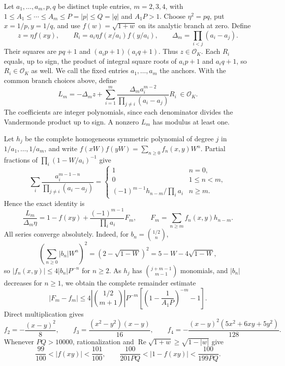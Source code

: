\documentclass[12pt]{article}
\numberwithin{equation}{section}
\begin{document}
Let \(a_1,\ldots,a_m,p,q\) be distinct tuple entries, \(m=2,3,4\), with
\(1\le A_1\le\cdots\le A_m\le P=|p|\le Q=|q|\) and \(A_1P>1\).
Choose \(\eta^2=pq\), put \(x=1/p,y=1/q\), and use
\(f(w)=\sqrt{1+w}\) on its analytic branch at zero. Define
\[
 z=\eta f(xy),\qquad
 R_i=a_i\eta f(x/a_i)f(y/a_i),\qquad
 \Delta_m=\prod_{i<j}(a_i-a_j).
\]
Their squares are \(pq+1\) and \((a_ip+1)(a_iq+1)\).
Thus \(z\in\mathcal O_K\). Each \(R_i\) equals, up to sign, the
product of integral square roots of \(a_ip+1\) and \(a_iq+1\), so
\(R_i\in\mathcal O_K\) as well. We call the fixed entries $a_1,\ldots,a_m$ the anchors.
With the common branch choices above, define
\begin{equation*}
 L_m=-\Delta_m z+
 \sum_{i=1}^m
 \frac{\Delta_m a_i^{m-2}}{\prod_{j\ne i}(a_i-a_j)}R_i
 \ \in\mathcal O_K.
\end{equation*}
The coefficients are integer polynomials, since each denominator divides
the Vandermonde product up to sign. A nonzero \(L_m\) has modulus at least one.

Let \(h_j\) be the complete homogeneous symmetric polynomial of degree
\(j\) in \(1/a_1,\ldots,1/a_m\), and write
\(f(xW)f(yW)=\sum_{n\ge0}f_n(x,y)W^n\).
Partial fractions of \(\prod_i(1-W/a_i)^{-1}\) give
\[
 \sum_i\frac{a_i^{m-1-n}}{\prod_{j\ne i}(a_i-a_j)}
 =\begin{cases}
 1&n=0,\\
 0&1\le n<m,\\
 (-1)^{m-1}h_{n-m}/\prod_i a_i&n\ge m.
 \end{cases}
\]
Hence the exact identity is
\begin{equation}\label{eq:coherent-exact}
 \frac{L_m}{\Delta_m\eta}
 =1-f(xy)+\frac{(-1)^{m-1}}{\prod_i a_i}F_m,\qquad
 F_m=\sum_{n\ge m}f_n(x,y)h_{n-m}.
\end{equation}
All series converge absolutely. Indeed, for \(b_n=\binom{1/2}{n}\),
\[
 \left(\sum_{n\ge0}|b_n|W^n\right)^2
 =(2-\sqrt{1-W})^2=5-W-4\sqrt{1-W},
\]
so \(|f_n(x,y)|\le4|b_n|P^{-n}\) for \(n\ge2\).
As \(h_j\) has \(\binom{j+m-1}{m-1}\) monomials, and \(|b_n|\)
decreases for \(n\ge1\), we obtain the complete remainder estimate
\begin{equation}\label{eq:coherent-tail}
 |F_m-f_m|\le
 4\left|\binom{1/2}{m+1}\right|P^{-m}
 \left[\left(1-\frac1{A_1P}\right)^{-m}-1\right].
\end{equation}
Direct multiplication gives
\begin{equation}\label{eq:integrated-5}
f_2=-\frac{(x-y)^2}{8},\qquad
 f_3=\frac{(x^2-y^2)(x-y)}{16},\qquad
 f_4=-\frac{(x-y)^2(5x^2+6xy+5y^2)}{128}.
\end{equation}
Whenever \(PQ>10000\), rationalization and
\(\operatorname{Re}\sqrt{1+w}\ge\sqrt{1-|w|}\) give
\begin{equation}\label{eq:coherent-near-one}
 \frac{99}{100}<|f(xy)|<\frac{101}{100},\qquad
 \frac{100}{201PQ}<|1-f(xy)|<\frac{100}{199PQ}.
\end{equation}
\end{document}
